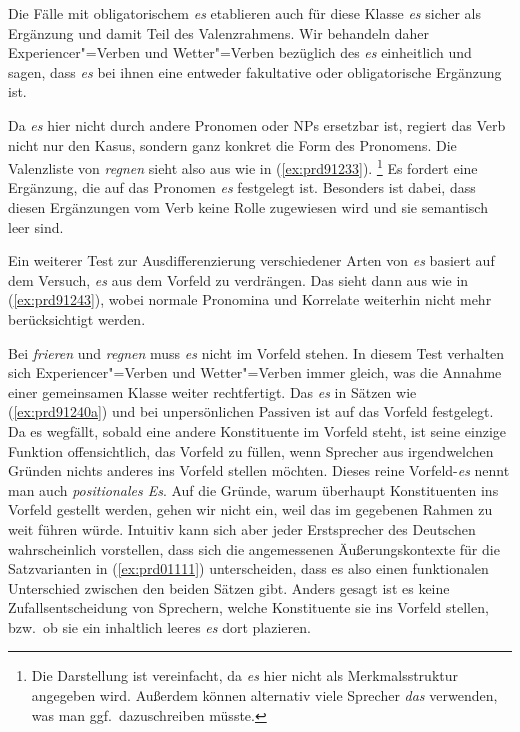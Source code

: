 Die Fälle mit obligatorischem \textit{es} etablieren auch für diese Klasse \textit{es} sicher als Ergänzung und damit Teil des Valenzrahmens.
Wir behandeln daher Experiencer"=Verben und Wetter"=Verben bezüglich des \textit{es} einheitlich und sagen, dass \textit{es} bei ihnen eine entweder fakultative oder obligatorische Ergänzung ist.

Da \textit{es} hier nicht durch andere Pronomen oder NPs ersetzbar ist, regiert das Verb nicht nur den Kasus, sondern ganz konkret die Form des Pronomens.
Die Valenzliste von \textit{regnen} sieht also aus wie in (\ref{ex:prd91233}).%
\footnote{Die Darstellung ist vereinfacht, da \textit{es} hier nicht als Merkmalsstruktur angegeben wird.
Außerdem können alternativ viele Sprecher \textit{das} verwenden, was man ggf.\ dazuschreiben müsste.}
Es fordert eine Ergänzung, die auf das Pronomen \textit{es} festgelegt ist.
Besonders ist dabei, dass diesen Ergänzungen vom Verb keine Rolle zugewiesen wird und sie semantisch leer sind.

\begin{exe}
\end{exe}

Ein weiterer Test zur Ausdifferenzierung verschiedener Arten von \textit{es} basiert auf dem Versuch, \textit{es} aus dem Vorfeld zu verdrängen.
Das sieht dann aus wie in (\ref{ex:prd91243}), wobei normale Pronomina und Korrelate weiterhin nicht mehr berücksichtigt werden.

\begin{exe}
  \ex\label{ex:prd91243}
  \begin{xlist}
  \end{xlist}
\end{exe}

Bei \textit{frieren} und \textit{regnen} muss \textit{es} nicht im Vorfeld stehen.
In diesem Test verhalten sich Experiencer"=Verben und Wetter"=Verben immer gleich, was die Annahme einer gemeinsamen Klasse weiter rechtfertigt.
Das \textit{es} in Sätzen wie (\ref{ex:prd91240a}) und bei unpersönlichen Passiven ist auf das Vorfeld festgelegt.
Da es wegfällt, sobald eine andere Konstituente im Vorfeld steht, ist seine einzige Funktion offensichtlich, das Vorfeld zu füllen, wenn Sprecher aus irgendwelchen Gründen nichts anderes ins Vorfeld stellen möchten.
Dieses reine Vorfeld-\textit{es} nennt man auch \textit{positionales Es}.
Auf die Gründe, warum überhaupt Konstituenten ins Vorfeld gestellt werden, gehen wir nicht ein, weil das im gegebenen Rahmen zu weit führen würde.
Intuitiv kann sich aber jeder Erstsprecher des Deutschen wahrscheinlich vorstellen, dass sich die angemessenen Äußerungskontexte für die Satzvarianten in (\ref{ex:prd01111}) unterscheiden, dass es also einen funktionalen Unterschied zwischen den beiden Sätzen gibt.
Anders gesagt ist es keine Zufallsentscheidung von Sprechern, welche Konstituente sie ins Vorfeld stellen, bzw.\ ob sie ein inhaltlich leeres \textit{es} dort plazieren.

